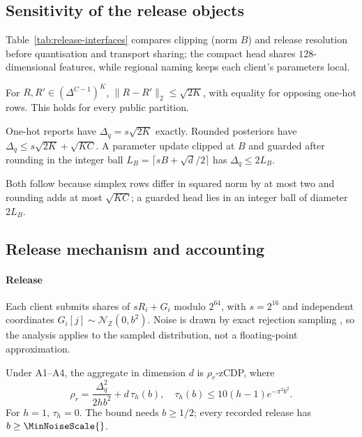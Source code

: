 \subsection{Sensitivity of the release objects}

Table~\ref{tab:release-interfaces} compares clipping (norm $B$) and release
resolution before quantisation and transport sharing;
the compact head shares $128$-dimensional features, while regional naming
keeps each client's parameters local.

\begin{lemma}
\label{lem:sens}
For $R,R'\in(\Delta^{C-1})^K$, $\|R-R'\|_2\le\sqrt{2K}$,
with equality for opposing one-hot rows. This holds for every public partition.
\end{lemma}

\begin{lemma}
\label{lem:sens-int}
One-hot reports have $\Delta_q=s\sqrt{2K}$ exactly.
Rounded posteriors have $\Delta_q\le s\sqrt{2K}+\sqrt{KC}$.
A parameter update clipped at $B$ and guarded after rounding in the integer
ball $L_B=\lceil sB+\sqrt d/2\rceil$ has $\Delta_q\le2L_B$.
\end{lemma}

Both follow because simplex rows differ in squared norm by at most two and
rounding adds at most $\sqrt{KC}$; a guarded head lies in an integer ball of
diameter $2L_B$.

\subsection{Release mechanism and accounting}

\paragraph{Release}
Each client submits shares of $sR_i+G_i$ modulo $2^{64}$, with
$s=2^{16}$ and independent coordinates
$G_i[j]\sim\mathcal N_{\mathbb Z}(0,b^2)$.
Noise is drawn by exact rejection sampling \cite{canonne2020discrete}, so the
analysis applies to the sampled distribution, not a floating-point
approximation.

\begin{theorem}
\label{thm:round}
Under A1--A4, the aggregate in dimension $d$ is $\rho_r$-zCDP, where
\begin{equation}
\rho_r=\frac{\Delta_q^2}{2hb^2}+d\,\tau_h(b),
\quad \tau_h(b)\le10(h-1)e^{-\pi^2b^2}.
\label{eq:round-rho}
\end{equation}
For $h=1$, $\tau_h=0$. The bound needs $b\ge1/2$; every recorded release has
$b\ge\MinNoiseScale{}$.
\end{theorem}


